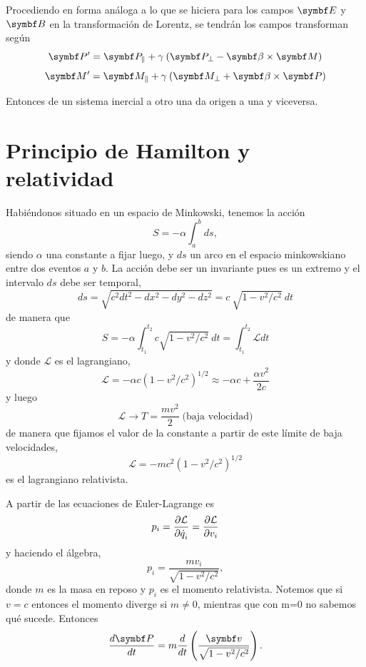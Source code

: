 \documentclass[10pt,oneside]{CBFT_book}
\begin{document}
Procediendo en forma análoga a lo que se hiciera para los campos $\vb{E}$ y $\vb{B}$
en la transformación de Lorentz, se tendrán los campos transforman según 
\[
	\vb{P}' = \vb{P}_\parallel + \gamma \: ( \vb{P}_\perp  - \pv{\beta}{M} )
\]
\[
	\vb{M}' = \vb{M}_\parallel + \gamma \: ( \vb{M}_\perp  + \pv{\beta}{P} )
\]

Entonces de un sistema inercial a otro una  da origen a una  y viceversa.

\section{Principio de Hamilton y relatividad}

Habiéndonos situado en un espacio de Minkowski, tenemos la acción
\[
	S = -\alpha \int_a^b ds,
\]
siendo $\alpha$ una constante a fijar luego, y $ds$ un arco en el espacio minkowskiano entre
dos eventos $a$ y $b$. 
La acción debe ser un invariante pues es un extremo y el intervalo $ds$ debe ser temporal,
\[
	ds = \sqrt{ c^2 dt^2 - dx^2 - dy^2 - dz^2 } = 
	c \: \sqrt{ 1 - v^2/c^2 } \: dt
\]
de manera que 
\[
	S = -\alpha \int_{t_1}^{t_2} c \sqrt{ 1 - v^2/c^2 } \: dt = 
	\int_{t_1}^{t_2} \mathcal{L} dt
\]
y donde $\mathcal{L}$ es el lagrangiano, 
\[
	\mathcal{L} = -\alpha c \left( 1 - v^2/c^2 \right)^{1/2} \approx -\alpha c + \frac{\alpha v^2}{2c}
\]
y luego 
\[
	\mathcal{L} \to T = \frac{m v^2}{2} \; \text{(baja velocidad)}
\]
de manera que fijamos el valor de la constante a partir de este límite de baja velocidades,
\[
	\mathcal{L} = -m c^2 \left( 1 - v^2/c^2 \right)^{1/2}
\]
es el lagrangiano relativista.

A partir de las ecuaciones de Euler-Lagrange es 
\[
	p_i = \frac{\partial^{\hspace{-0.05em}} {\mathcal{L}}}{\partial {\dot{q}_i}^{\hspace{-0.05em}}} = \frac{\partial^{\hspace{-0.05em}} {\mathcal{L}}}{\partial {v_i}^{\hspace{-0.05em}}}
\]
y haciendo el álgebra,
\[
	p_i = \frac{ m v_i }{\sqrt{ 1 - v^2/c^2 }},
\]
donde $m$ es la masa en reposo y $p_i$ es el momento relativista. 
Notemos que si $v=c$ entonces el momento diverge si $m\neq 0$, mientras que con m=0 no sabemos
qué sucede.
Entonces
\[
	\dtot{\vb{P}}{t} = m \dtot{}{t}\left( \frac{\vb{v}}{\sqrt{1 - v^2/c^2 }}\right).
\]
\end{document}
